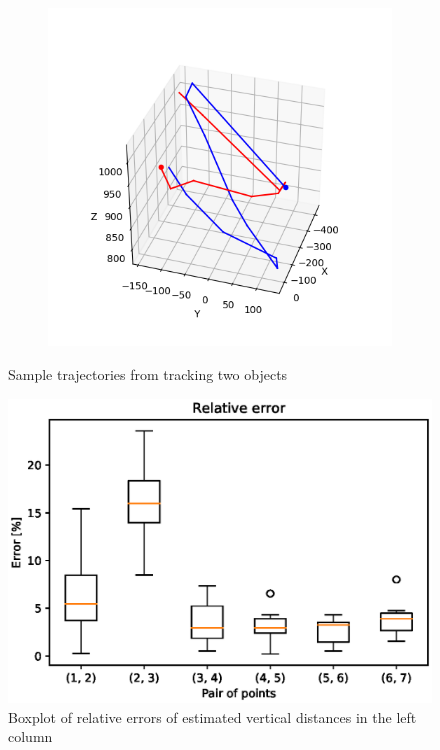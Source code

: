 \begin{figure}
\begin{subfigure}{0.48\linewidth}
	\includegraphics[width=\linewidth]{img/experiments/trajectories2.png}
\end{subfigure}
\caption{Sample trajectories from tracking two objects}
\label{fig:two-trajectories}
\end{figure}

\begin{figure}
\includegraphics[width=\linewidth]{experiments/leftcolumn.eps}
\caption{Boxplot of relative errors of estimated vertical distances in the left column}
\label{fig:verticalleft-boxplot}
\end{figure}

